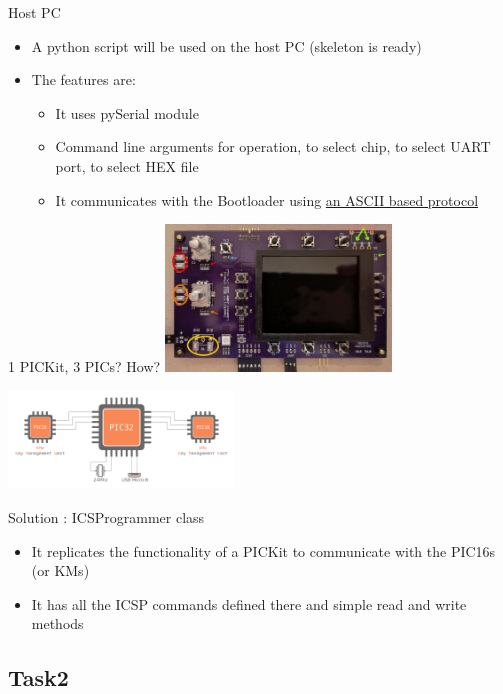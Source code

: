 \documentclass{beamer}
\begin{document}
\begin{frame}{Host PC}
	\begin{itemize}
		\item A python script will be used on the host PC (skeleton is ready)
		\item The features are:
			\begin{itemize}
				\item It uses pySerial module
				\item Command line arguments for operation, to select chip, to select UART port, to select HEX file
				\item It communicates with the Bootloader using \href{https://github.com/apertus-open-source-cinema/AXIOM-Remote/tree/dev/Firmware}{an ASCII based protocol}
			\end{itemize}
	\end{itemize}
\end{frame}

\begin{frame}{1 PICKit, 3 PICs? How?}
	\includegraphics[width=6cm, left]{images/new_remote_prototype.jpg}

	\includegraphics[width=6cm, right]{images/AXIOM_Remote_schematic.png}
\end{frame}

\begin{frame}{Solution : ICSProgrammer class}
	\begin{itemize}
		\item It replicates the functionality of a PICKit to communicate with the PIC16s (or KMs)
		\item It has all the ICSP commands defined there and simple read and write methods
	\end{itemize}
\end{frame}

\subsection{Task2}
\end{document}
